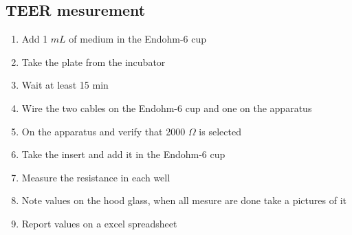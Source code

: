 \subsection{TEER mesurement}
\label{TEER}

\begin{enumerate}
\item Add 1 $mL$ of medium in the Endohm-6 cup
\item Take the plate from the incubator
\item Wait at least 15 min 
\item Wire the two cables on the  Endohm-6 cup and one on the apparatus 
\item On the apparatus and verify that 2000 $\Omega$ is selected
\item Take the insert and add it in the Endohm-6 cup
\item Measure the resistance in each well 
\item Note values on the hood glass, when all mesure are done take a pictures of it
\item Report values on a excel spreadsheet
\end{enumerate}